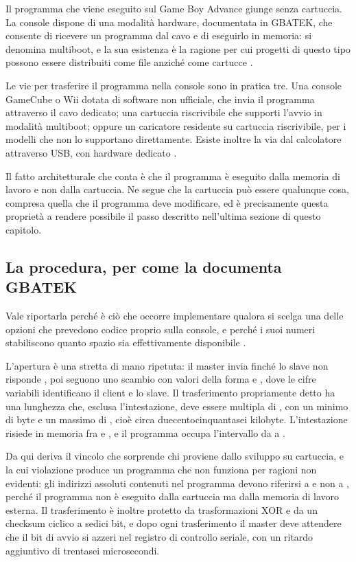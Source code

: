 Il programma che viene eseguito sul Game Boy Advance giunge senza cartuccia. La console dispone di una modalità hardware, documentata in GBATEK, che consente di ricevere un programma dal cavo e di eseguirlo in memoria: si denomina multiboot, e la sua esistenza è la ragione per cui progetti di questo tipo possono essere distribuiti come file anziché come cartucce \cite{gbatek}.

Le vie per trasferire il programma nella console sono in pratica tre. Una console GameCube o Wii dotata di software non ufficiale, che invia il programma attraverso il cavo dedicato; una cartuccia riscrivibile che supporti l'avvio in modalità multiboot; oppure un caricatore residente su cartuccia riscrivibile, per i modelli che non lo supportano direttamente. Esiste inoltre la via dal calcolatore attraverso USB, con hardware dedicato \cite{usb-gba-multiboot,rom-sender}.

Il fatto architetturale che conta è che il programma è eseguito dalla memoria di lavoro e non dalla cartuccia. Ne segue che la cartuccia può essere qualunque cosa, compresa quella che il programma deve modificare, ed è precisamente questa proprietà a rendere possibile il passo descritto nell'ultima sezione di questo capitolo.

\subsection{La procedura, per come la documenta GBATEK}

Vale riportarla perché è ciò che occorre implementare qualora si scelga una delle opzioni che prevedono codice proprio sulla console, e perché i suoi numeri stabiliscono quanto spazio sia effettivamente disponibile \cite{gbatek}.

L'apertura è una stretta di mano ripetuta: il master invia  finché lo slave non risponde , poi seguono uno scambio con valori della forma  e , dove le cifre variabili identificano il client e lo slave. Il trasferimento propriamente detto ha una lunghezza che, esclusa l'intestazione, deve essere multipla di , con un minimo di  byte e un massimo di , cioè circa duecentocinquantasei kilobyte. L'intestazione risiede in memoria fra  e , e il programma occupa l'intervallo da  a .

Da qui deriva il vincolo che sorprende chi proviene dallo sviluppo su cartuccia, e la cui violazione produce un programma che non funziona per ragioni non evidenti: gli indirizzi assoluti contenuti nel programma devono riferirsi a  e non a , perché il programma non è eseguito dalla cartuccia ma dalla memoria di lavoro esterna. Il trasferimento è inoltre protetto da trasformazioni XOR e da un checksum ciclico a sedici bit, e dopo ogni trasferimento il master deve attendere che il bit di avvio si azzeri nel registro di controllo seriale, con un ritardo aggiuntivo di trentasei microsecondi.


